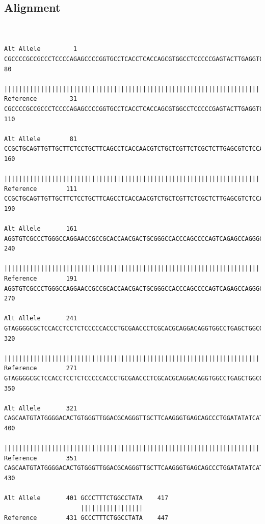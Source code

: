 \documentclass[UTF8,a4paper,landscape]{ctexart}\usepackage[]{graphicx}\usepackage[]{color}
\makeatletter
\newenvironment{kframe}{%
 \def\at@end@of@kframe{}%
 \ifinner\ifhmode%
  \def\at@end@of@kframe{\end{minipage}}%
  \begin{minipage}{\columnwidth}%
 \fi\fi%
 \def\FrameCommand##1{\hskip\@totalleftmargin \hskip-\fboxsep
 \colorbox{shadecolor}{##1}\hskip-\fboxsep
     \hskip-\linewidth \hskip-\@totalleftmargin \hskip\columnwidth}%
 \MakeFramed {\advance\hsize-\width
   \@totalleftmargin\z@ \linewidth\hsize
   \@setminipage}}%
 {\par\unskip\endMakeFramed%
 \at@end@of@kframe}
\newenvironment{knitrout}{}{} %
\makeatother
\begin{document}
\subsection*{Alignment}
\begin{knitrout}
\color{fgcolor}\begin{kframe}
\begin{verbatim}


Alt Allele         1 CGCCCCGCCGCCCTCCCCAGAGCCCCGGTGCCTCACCTCACCAGCGTGGCCTCCCCCGAGTACTTGAGGTCTTCCAGCTC     80
                     ||||||||||||||||||||||||||||||||||||||||||||||||||||||||||||||||||||||||||||||||
Reference         31 CGCCCCGCCGCCCTCCCCAGAGCCCCGGTGCCTCACCTCACCAGCGTGGCCTCCCCCGAGTACTTGAGGTCTTCCAGCTC    110

Alt Allele        81 CCGCTGCAGTTGTTGCTTCTCCTGCTTCAGCCTCACCAACGTCTGCTCGTTCTCGCTCTTGAGCGTCTCCAACTGCGCGA    160
                     ||||||||||||||||||||||||||||||||||||||||||||||||||||||||||||||||||||||||||||||||
Reference        111 CCGCTGCAGTTGTTGCTTCTCCTGCTTCAGCCTCACCAACGTCTGCTCGTTCTCGCTCTTGAGCGTCTCCAACTGCGCGA    190

Alt Allele       161 AGGTGTCGCCCTGGGCCAGGAACCGCCGCACCAACGACTGCGGGCCACCCAGCCCCAGTCAGAGCCAGGGCCTAGGGAGC    240
                     ||||||||||||||||||||||||||||||||||||||||||||||||||||||||||||||||||||||||||||||||
Reference        191 AGGTGTCGCCCTGGGCCAGGAACCGCCGCACCAACGACTGCGGGCCACCCAGCCCCAGTCAGAGCCAGGGCCTAGGGAGC    270

Alt Allele       241 GTAGGGGCGCTCCACCTCCTCTCCCCCACCCTGCGAACCCTCGCACGCAGGACAGGTGGCCTGAGCTGGCGCCTTTTGCA    320
                     ||||||||||||||||||||||||||||||||||||||||||||||||||||||||||||||||||||||||||||||||
Reference        271 GTAGGGGCGCTCCACCTCCTCTCCCCCACCCTGCGAACCCTCGCACGCAGGACAGGTGGCCTGAGCTGGCGCCTTTTGCA    350

Alt Allele       321 CAGCAATGTATGGGGACACTGTGGGTTGGACGCAGGGTTGCTTCAAGGGTGAGCAGCCCTGGATATATCATTTTTGCGGG    400
                     ||||||||||||||||||||||||||||||||||||||||||||||||||||||||||||||||||||||||||||||||
Reference        351 CAGCAATGTATGGGGACACTGTGGGTTGGACGCAGGGTTGCTTCAAGGGTGAGCAGCCCTGGATATATCATTTTTGCGGG    430

Alt Allele       401 GCCCTTTCTGGCCTATA    417
                     |||||||||||||||||
Reference        431 GCCCTTTCTGGCCTATA    447
\end{verbatim}
\end{kframe}
\end{knitrout}
\end{document}

